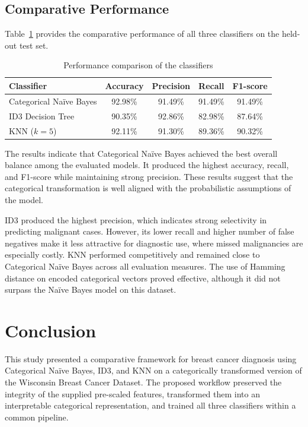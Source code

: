 \documentclass[conference]{IEEEtran}
\begin{document}
\subsection{Comparative Performance}
Table~\ref{tab:metrics} provides the comparative performance of all three classifiers on the held-out test set.

\begin{table}[!t]
\caption{Performance comparison of the classifiers}
\label{tab:metrics}
\centering
\begin{tabular}{lcccc}
\toprule
Classifier & Accuracy & Precision & Recall & F1-score \\
\midrule
Categorical Na\"ive Bayes & 92.98\% & 91.49\% & 91.49\% & 91.49\% \\
ID3 Decision Tree & 90.35\% & 92.86\% & 82.98\% & 87.64\% \\
KNN ($k=5$) & 92.11\% & 91.30\% & 89.36\% & 90.32\% \\
\bottomrule
\end{tabular}
\end{table}

The results indicate that Categorical Na\"ive Bayes achieved the best overall balance among the evaluated models. It produced the highest accuracy, recall, and F1-score while maintaining strong precision. These results suggest that the categorical transformation is well aligned with the probabilistic assumptions of the model.

ID3 produced the highest precision, which indicates strong selectivity in predicting malignant cases. However, its lower recall and higher number of false negatives make it less attractive for diagnostic use, where missed malignancies are especially costly. KNN performed competitively and remained close to Categorical Na\"ive Bayes across all evaluation measures. The use of Hamming distance on encoded categorical vectors proved effective, although it did not surpass the Na\"ive Bayes model on this dataset.

\section{Conclusion}
This study presented a comparative framework for breast cancer diagnosis using Categorical Na\"ive Bayes, ID3, and KNN on a categorically transformed version of the Wisconsin Breast Cancer Dataset. The proposed workflow preserved the integrity of the supplied pre-scaled features, transformed them into an interpretable categorical representation, and trained all three classifiers within a common pipeline.
\end{document}
